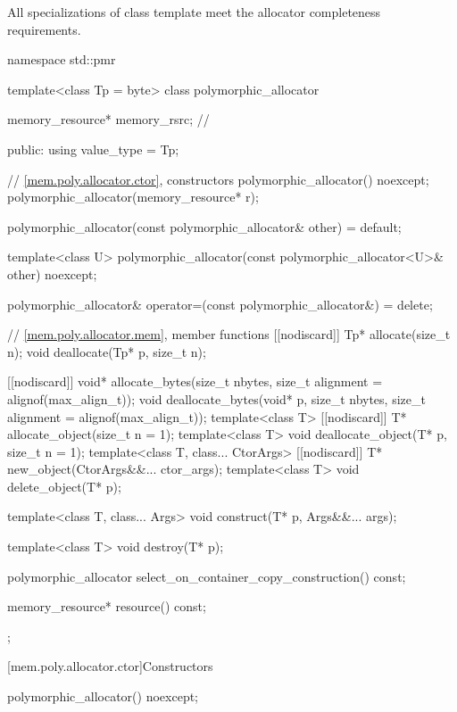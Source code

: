 \pnum
All specializations of class template 
meet the allocator completeness requirements.

%
%
\begin{codeblock}
namespace std::pmr {
  template<class Tp = byte> class polymorphic_allocator {
    memory_resource* memory_rsrc;       // \expos

  public:
    using value_type = Tp;

    // \ref{mem.poly.allocator.ctor}, constructors
    polymorphic_allocator() noexcept;
    polymorphic_allocator(memory_resource* r);

    polymorphic_allocator(const polymorphic_allocator& other) = default;

    template<class U>
      polymorphic_allocator(const polymorphic_allocator<U>& other) noexcept;

    polymorphic_allocator& operator=(const polymorphic_allocator&) = delete;

    // \ref{mem.poly.allocator.mem}, member functions
    [[nodiscard]] Tp* allocate(size_t n);
    void deallocate(Tp* p, size_t n);

    [[nodiscard]] void* allocate_bytes(size_t nbytes, size_t alignment = alignof(max_align_t));
    void deallocate_bytes(void* p, size_t nbytes, size_t alignment = alignof(max_align_t));
    template<class T> [[nodiscard]] T* allocate_object(size_t n = 1);
    template<class T> void deallocate_object(T* p, size_t n = 1);
    template<class T, class... CtorArgs> [[nodiscard]] T* new_object(CtorArgs&&... ctor_args);
    template<class T> void delete_object(T* p);

    template<class T, class... Args>
      void construct(T* p, Args&&... args);

    template<class T>
      void destroy(T* p);

    polymorphic_allocator select_on_container_copy_construction() const;

    memory_resource* resource() const;
  };
}
\end{codeblock}

[mem.poly.allocator.ctor]{Constructors}

%
\begin{itemdecl}
polymorphic_allocator() noexcept;
\end{itemdecl}

